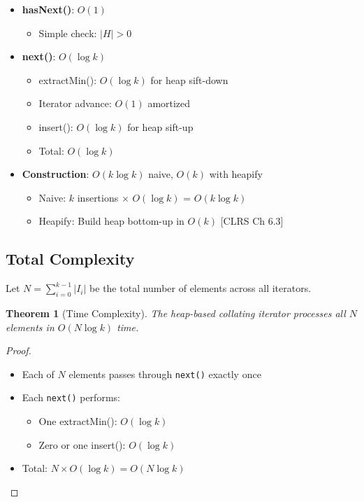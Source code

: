 \documentclass[11pt]{article}
\newtheorem{theorem}{Theorem}
\begin{document}
\begin{itemize}
    \item \textbf{hasNext()}: $O(1)$
    \begin{itemize}
        \item Simple check: $|H| > 0$
    \end{itemize}

    \item \textbf{next()}: $O(\log k)$
    \begin{itemize}
        \item extractMin(): $O(\log k)$ for heap sift-down
        \item Iterator advance: $O(1)$ amortized
        \item insert(): $O(\log k)$ for heap sift-up
        \item Total: $O(\log k)$
    \end{itemize}

    \item \textbf{Construction}: $O(k \log k)$ naive, $O(k)$ with heapify
    \begin{itemize}
        \item Naive: $k$ insertions $\times$ $O(\log k)$ = $O(k \log k)$
        \item Heapify: Build heap bottom-up in $O(k)$ [CLRS Ch 6.3]
    \end{itemize}
\end{itemize}

\subsection{Total Complexity}

Let $N = \sum_{i=0}^{k-1} |I_i|$ be the total number of elements across all iterators.

\begin{theorem}[Time Complexity]
The heap-based collating iterator processes all $N$ elements in $O(N \log k)$ time.
\end{theorem}

\begin{proof}
\begin{itemize}
    \item Each of $N$ elements passes through \texttt{next()} exactly once
    \item Each \texttt{next()} performs:
    \begin{itemize}
        \item One extractMin(): $O(\log k)$
        \item Zero or one insert(): $O(\log k)$
    \end{itemize}
    \item Total: $N \times O(\log k) = O(N \log k)$
\end{itemize}
\end{proof}
\end{document}
